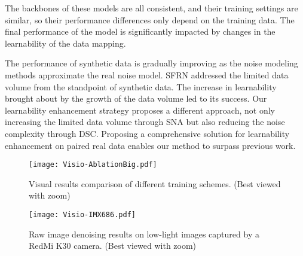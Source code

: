 \documentclass[sigconf,screen,nonacm]{acmart}
\begin{document}
The backbones of these models are all consistent, and their training settings are similar, so their performance differences only depend on the training data.
    The final performance of the model is significantly impacted by changes in the learnability of the data mapping.

The performance of synthetic data is gradually improving as the noise modeling methods approximate the real noise model.
    SFRN addressed the limited data volume from the standpoint of synthetic data. The increase in learnability brought about by the growth of the data volume led to its success.
    Our learnability enhancement strategy proposes a different approach, not only increasing the limited data volume through SNA but also reducing the noise complexity through DSC. Proposing a comprehensive solution for learnability enhancement on paired real data enables our method to surpass previous work.
    
    \begin{figure*}[t!]
        \texttt{[image: Visio-AblationBig.pdf]}
        \caption{Visual results comparison of different training schemes. (Best viewed with zoom)}
        \label{fig:ablation}
    \end{figure*}
    \begin{figure*}[t!]
        \texttt{[image: Visio-IMX686.pdf]}
\caption{Raw image denoising results on low-light images captured by a RedMi K30 camera. (Best viewed with zoom)}
        \label{fig:IMX686}
    \end{figure*}
\end{document}
